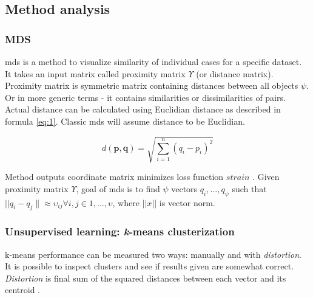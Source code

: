 \documentclass[a4paper,12pt]{article}
\begin{document}
	\clearpage
	
	\subsection{Method analysis}
	\subsubsection{MDS}
	
	\acrfull{mds} is a method to visualize similarity of individual cases for a specific dataset. It takes an input matrix called proximity matrix $\Upsilon$ (or distance matrix). Proximity matrix is symmetric matrix containing distances between all objects $\psi$. Or in more generic terms - it contains similarities or dissimilarities of pairs. Actual distance can be calculated using Euclidian distance as described in formula \ref{eq:1}. Classic \acrshort{mds} will assume distance to be Euclidian.
	\begin{center}
		\begin{equation}\label{eq:1}
		d(\mathbf{p},\mathbf{q}) = \sqrt{\sum_{i=1}^n (q_i-p_i)^2}
		\end{equation}
	\end{center} 
	
	Method outputs coordinate matrix minimizes loss function $strain$ \cite{BorgGroenen2005}. Given proximity matrix $\Upsilon$, goal of \acrshort{mds} is to find $\psi$ vectors $q_i,...,q_\psi$ such that $||q_i - q_j\| \approx \upsilon_{ij} \forall i,j \in 1,...,\upsilon$, where $||x||$ is vector norm. 
	
	
	\subsubsection{Unsupervised learning: {\textit k-means} clusterization }
	
	
	\gls{k-means} performance can be measured two ways: manually and with \textit{distortion}. It is possible to inspect clusters and see if results given are somewhat correct. \textit{Distortion} is final sum of the squared distances between each vector and its centroid \cite{selection_k_means}.
	
\end{document}
